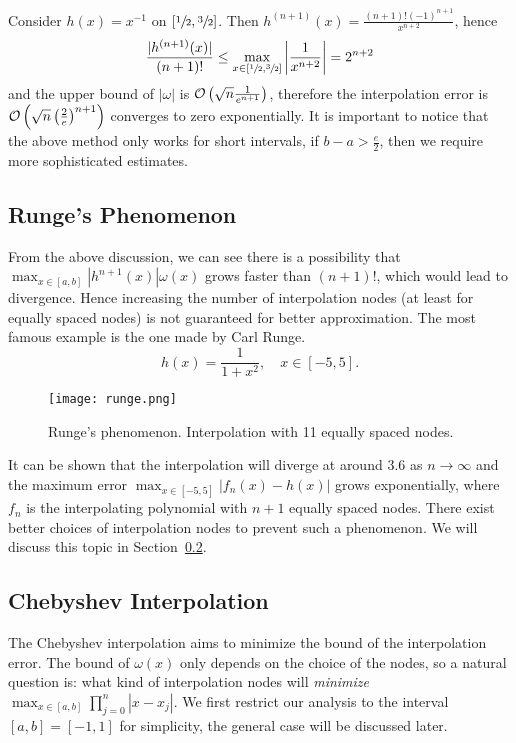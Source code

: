 \begin{example}
    Consider $h(x) = x^{-1}$ on $[\sfrac{1}{2}, \sfrac{3}{2}]$. Then $h^{(n+1)}(x) = \frac{(n+1)!(-1)^{n+1}}{x^{n+2}}$, hence 
    \begin{equation}
        \frac{| h^{(n+1)}(x) |}{(n+1)!} \le \max_{x\in[\sfrac{1}{2}, \sfrac{3}{2}]} \left| \frac{1}{x^{n+2}} \right| = 2^{n+2}
    \end{equation}
    and the upper bound of $|\omega|$ is $\mathcal O\left(\sqrt{n}\frac{1}{e^{n+1}}\right)$, therefore the interpolation error is $\mathcal O\left( \sqrt{n} \left(\frac{2}{e}\right)^{n+1}\right)$ converges to zero exponentially. It is important to notice that the above method only works for short intervals, if $b-a > \frac{e}{2}$, then we require more sophisticated estimates. 
\end{example} 

\subsection{Runge's Phenomenon}
\label{SSec: 2-Run-Phe}
From the above discussion, we can see there is a possibility that $\max_{x\in[a,b]}|h^{n+1}(x)|\omega(x)$ grows faster than $(n+1)!$, which would lead to divergence. Hence increasing the number of interpolation nodes (at least for equally spaced nodes) is not guaranteed for better approximation. The most famous example is the one made by Carl Runge. 
\begin{equation}
    h(x) = \frac{1}{1+x^2},\quad x\in [-5, 5].
\end{equation} 
\begin{figure}[!htb]
    \centering
    \texttt{[image: runge.png]}
    \caption{Runge's phenomenon. Interpolation with 11 equally spaced nodes. }
\end{figure}
It can be shown that the interpolation will diverge at around $3.6$ as $n\to \infty$ and the maximum error $\max_{x\in[-5, 5]} |f_n(x) - h(x) |$ grows exponentially, where $f_n$ is the interpolating polynomial with $n+1$ equally spaced nodes. There exist better choices of interpolation nodes to prevent such a phenomenon. We will discuss this topic in Section~\ref{Sec: 2-Che-Int}. 

\subsection{Chebyshev Interpolation}
\label{Sec: 2-Che-Int}
The Chebyshev interpolation aims to minimize the bound of the interpolation error. The bound of $\omega(x)$ only depends on the choice of the nodes, so a natural question is: what kind of interpolation nodes will \emph{minimize} 
$\max_{x\in [a, b]} \prod_{j=0}^n |x-x_j|$. We first restrict our analysis to the interval $[a, b] = [-1,1]$ for simplicity, the general case will be discussed later.
 
